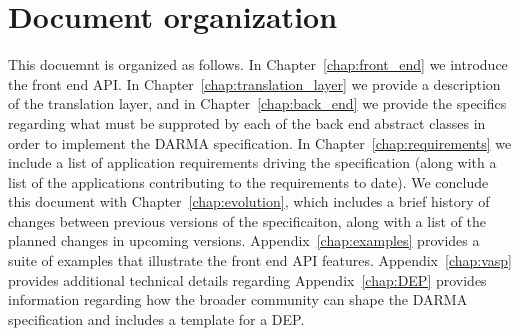 \section{Document organization}
\label{sec:organization}
This docuemnt is organized as follows.  In Chapter~\ref{chap:front_end} we
introduce the \gls{front end} \gls{API}.  In
Chapter~\ref{chap:translation_layer} we
provide a description of the \gls{translation layer}, and in
Chapter~\ref{chap:back_end} we provide the specifics regarding what must be
supproted by each of the \gls{back end} abstract classes in order to implement
the DARMA specification. In Chapter~\ref{chap:requirements} we include a list
of application requirements driving the specification (along with a list of the
    applications contributing to the requirements to date).
We conclude this document with
Chapter~\ref{chap:evolution}, which includes a brief history of changes between
previous versions of the specificaiton, along with a list of the planned changes 
in upcoming versions.
Appendix~\ref{chap:examples} provides a suite of examples that illustrate the
 \gls{front end} \gls{API} features. Appendix~\ref{chap:vasp} provides
additional technical details regarding %
Appendix~\ref{chap:DEP} provides information regarding how the broader
community can shape the \gls{DARMA} specification and includes a template for 
a \gls{DEP}. 

